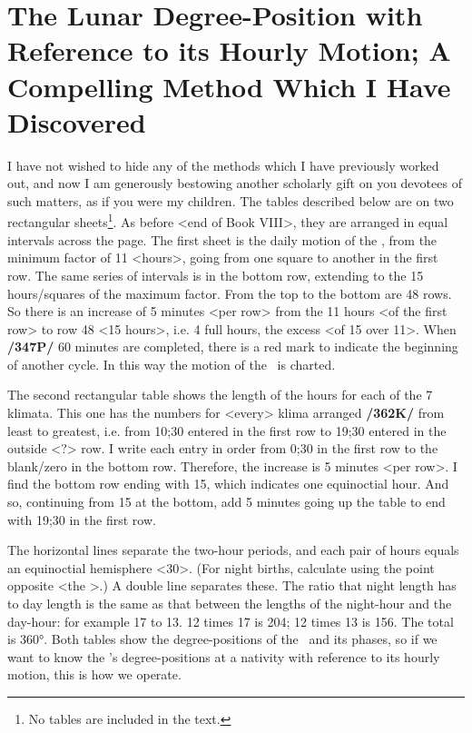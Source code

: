 \section{The Lunar Degree-Position with Reference to its Hourly Motion; A Compelling Method Which I Have Discovered}

I have not wished to hide any of the methods which I have previously worked out, and now I am generously bestowing another scholarly gift on you devotees of such matters, as if you were my children. The tables described below are on two rectangular sheets\footnote{No tables are included in the text.}. As before <end of Book VIII>, they are arranged in equal intervals across the page. The first sheet is the daily motion of the \Moon, from the minimum
factor of 11 <hours>, going from one square to another in the first row. The same series of intervals is in the bottom row, extending to the 15 hours/squares of the maximum factor. From the top to the bottom are 48 rows. So there is an increase of 5 minutes <per row> from the 11 hours <of the first row> to row 48 <15 hours>, i.e. 4 full hours, the excess <of 15 over 11>. When \textbf{/347P/} 60 minutes are completed, there is a red mark to indicate the beginning of another cycle. In this way the motion of the \Moon\, is charted.

The second rectangular table shows the length of the hours for each of the 7 klimata. This one has the numbers for <every> klima arranged \textbf{/362K/} from least to greatest, i.e. from 10;30 entered in the first row to 19;30 entered in the outside <?> row. I write each entry in order from 0;30 in the first row to the blank/zero in the bottom row. Therefore, the increase is 5 minutes <per row>. I find the bottom row ending with 15, which indicates one equinoctial hour. And so, continuing from 15 at the bottom, add 5 minutes going up the table to end with 19;30 in the first row.

The horizontal lines separate the two-hour periods, and each pair of hours equals an equinoctial hemisphere <30>. (For night births, calculate using the point opposite <the \Moon>.) A double line
separates these. The ratio that night length has to day length is the same as that between the lengths of the night-hour and the day-hour: for example 17 to 13. 12 times 17 is 204; 12 times 13 is 156. The total is 360°. Both tables show the degree-positions of the \Moon\, and its phases, so if we want to know the \Moon’s degree-positions at a nativity with reference to its hourly motion, this is how we operate. 

